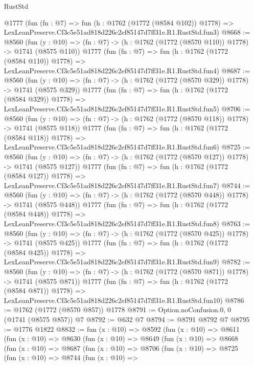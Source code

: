 \begin{lexlean}{RustStd}
\begin{coremodule}
    @1777
    (fun (fn : @7) =>
    fun (h : @1762 (@1772 (@8584 @102)) @1778) =>
    LexLeanPreserve.Cf3c5e51ad818d226c2ef85147d7ff31e.R1.RustStd.fun3)
@8668 := @8560
    (fun (y : @10) => (fn : @7) -> (h : @1762 (@1772 (@8570 @110)) @1778) -> @1741 (@8575 @110))
    @1777
    (fun (fn : @7) =>
    fun (h : @1762 (@1772 (@8584 @110)) @1778) =>
    LexLeanPreserve.Cf3c5e51ad818d226c2ef85147d7ff31e.R1.RustStd.fun4)
@8687 := @8560
    (fun (y : @10) => (fn : @7) -> (h : @1762 (@1772 (@8570 @329)) @1778) -> @1741 (@8575 @329))
    @1777
    (fun (fn : @7) =>
    fun (h : @1762 (@1772 (@8584 @329)) @1778) =>
    LexLeanPreserve.Cf3c5e51ad818d226c2ef85147d7ff31e.R1.RustStd.fun5)
@8706 := @8560
    (fun (y : @10) => (fn : @7) -> (h : @1762 (@1772 (@8570 @118)) @1778) -> @1741 (@8575 @118))
    @1777
    (fun (fn : @7) =>
    fun (h : @1762 (@1772 (@8584 @118)) @1778) =>
    LexLeanPreserve.Cf3c5e51ad818d226c2ef85147d7ff31e.R1.RustStd.fun6)
@8725 := @8560
    (fun (y : @10) => (fn : @7) -> (h : @1762 (@1772 (@8570 @127)) @1778) -> @1741 (@8575 @127))
    @1777
    (fun (fn : @7) =>
    fun (h : @1762 (@1772 (@8584 @127)) @1778) =>
    LexLeanPreserve.Cf3c5e51ad818d226c2ef85147d7ff31e.R1.RustStd.fun7)
@8744 := @8560
    (fun (y : @10) => (fn : @7) -> (h : @1762 (@1772 (@8570 @448)) @1778) -> @1741 (@8575 @448))
    @1777
    (fun (fn : @7) =>
    fun (h : @1762 (@1772 (@8584 @448)) @1778) =>
    LexLeanPreserve.Cf3c5e51ad818d226c2ef85147d7ff31e.R1.RustStd.fun8)
@8763 := @8560
    (fun (y : @10) => (fn : @7) -> (h : @1762 (@1772 (@8570 @425)) @1778) -> @1741 (@8575 @425))
    @1777
    (fun (fn : @7) =>
    fun (h : @1762 (@1772 (@8584 @425)) @1778) =>
    LexLeanPreserve.Cf3c5e51ad818d226c2ef85147d7ff31e.R1.RustStd.fun9)
@8782 := @8560
    (fun (y : @10) => (fn : @7) -> (h : @1762 (@1772 (@8570 @871)) @1778) -> @1741 (@8575 @871))
    @1777
    (fun (fn : @7) =>
    fun (h : @1762 (@1772 (@8584 @871)) @1778) =>
    LexLeanPreserve.Cf3c5e51ad818d226c2ef85147d7ff31e.R1.RustStd.fun10)
@8786 := @1762 (@1772 (@8570 @857)) @1778
@8791 := Option.noConfusion.{0, 0} (@1741 (@8575 @857)) @7
@8792 := @632 @7
@8794 := @8791 @8792 @7
@8795 := @1776 @1822
@8832 := fun (x : @10) =>
  @8592
    (fun (x : @10) =>
    @8611
      (fun (x : @10) =>
      @8630
        (fun (x : @10) =>
        @8649
          (fun (x : @10) =>
          @8668
            (fun (x : @10) =>
            @8687
              (fun (x : @10) =>
              @8706
                (fun (x : @10) =>
                @8725
                  (fun (x : @10) =>
                  @8744
                    (fun (x : @10) =>

\end{coremodule}
\end{lexlean}
